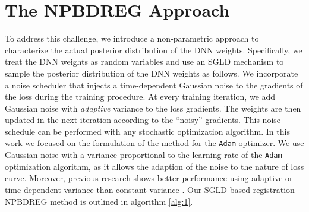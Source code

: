 \documentclass[preprint,authoryear]{elsarticle}
\begin{document}
\section{The NPBDREG Approach} \label{sec:NPBDREG}
To address this challenge, we introduce a non-parametric approach to characterize the actual posterior distribution of the DNN weights. Specifically, we treat the DNN weights as random variables and use an SGLD mechanism \cite{welling2011bayesian} to sample the posterior distribution of the DNN weights as follows. We incorporate a noise scheduler that injects a time-dependent Gaussian noise to the gradients of the loss during the training procedure. At every training iteration, we add Gaussian noise with \textit{adaptive} variance to the loss gradients. The weights are then updated in the next iteration according to the ``noisy'' gradients. This noise schedule can be performed with any stochastic optimization algorithm. In this work we focused on the formulation of the method for the \texttt{Adam} optimizer. We use Gaussian noise with a variance proportional to the learning rate of the \texttt{Adam} optimization algorithm, as it allows the adaption of the noise to the nature of loss curve. Moreover, previous research shows better performance using adaptive or time-dependent variance than constant variance \cite{neelakantan2015adding}. Our SGLD-based registration NPBDREG method is outlined in algorithm \ref{alg:1}. 
\end{document}
